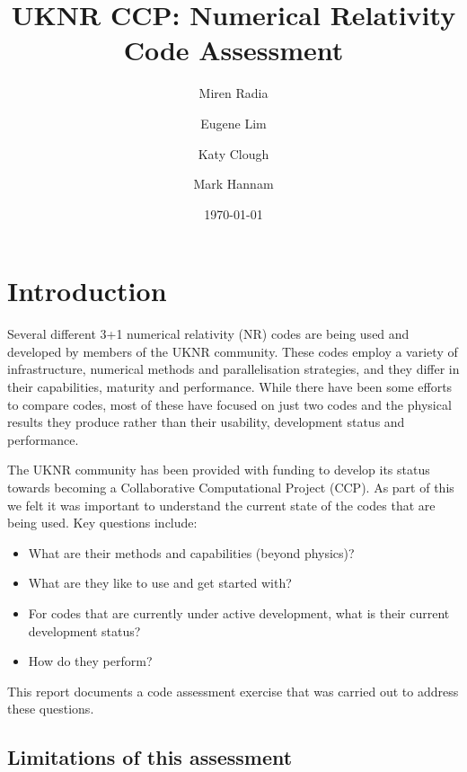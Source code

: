 \documentclass[12pt,a4paper]{article}
\title{UKNR CCP: Numerical Relativity Code Assessment}
\author[1]{Miren Radia}
\affil[1]{University of Cambridge}
\author[2]{Eugene Lim}
\affil[2]{King's College London}
\author[3]{Katy Clough}
\affil[3]{Queen Mary University of London}
\author[4]{Mark Hannam}
\affil[4]{Cardiff University}
\date{\today}
\numberwithin{figure}{subsection}
\begin{document}
\maketitle

\section{Introduction}

Several different 3+1 numerical relativity (NR) codes are being used and developed
by members of the UKNR community. These codes employ a variety of
infrastructure, numerical methods and parallelisation strategies, and they
differ in their capabilities, maturity and performance. While
there have been some efforts to compare codes, most of these
have focused on just two codes and the physical results they produce rather
than their usability, development status and performance.

The UKNR community has been provided with funding to develop its status towards becoming a
Collaborative Computational Project (CCP). As part of this we felt it was important to understand the
current state of the codes that are being used. Key questions include:
\begin{itemize}
    \item What are their methods and capabilities (beyond physics)?
    \item What are they like to use and get started with?
    \item For codes that are currently under active development, what is their
    current development status?
    \item How do they perform?
\end{itemize}
This report documents a code assessment exercise that was carried out to
address these questions.

\subsection{Limitations of this assessment}
\end{document}
